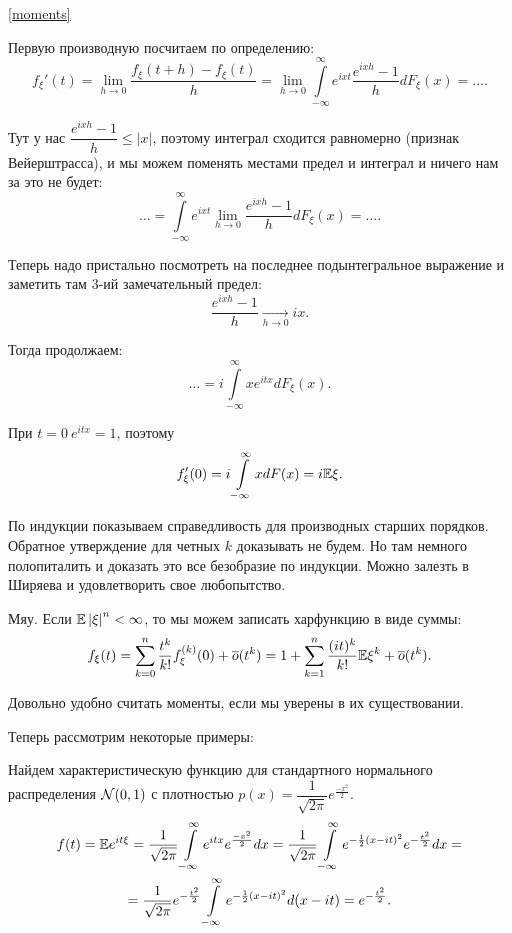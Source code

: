 \documentclass[../TV&MS.tex]{subfiles}
\begin{document}
\begin{Proof} \eqref{moments}

    Первую производную посчитаем по определению:
    \[
        f_\xi'(t) = \lim\limits_{h \rightarrow 0} \frac{f_\xi(t + h) - f_\xi(t)}{h}=
        \lim\limits_{h \rightarrow 0} \int\limits_{-\infty}^{\infty} e^{ixt} 
        \frac{e^{ixh} - 1}{h} dF_\xi(x) = \ldots. 
    \]
    
    Тут у нас $\dfrac{e^{ixh} - 1}{h} \leqslant \left| x \right|$,
    поэтому интеграл сходится равномерно (признак Вейерштрасса),
    и мы можем поменять местами предел и интеграл и ничего нам за это не будет:
    \[
        \ldots = \int\limits_{-\infty}^{\infty} e^{ixt} 
        \lim\limits_{h \rightarrow 0} \frac{e^{ixh} - 1}{h} dF_\xi(x) = \ldots.
    \] 
    
    Теперь надо пристально посмотреть на последнее подынтегральное выражение и заметить 
    там $3$-ий замечательный предел:
    \[
        \frac{e^{ixh} - 1}{h} \xrightarrow[h \rightarrow 0]{} ix.
    \] 
    
    Тогда продолжаем:
    \[
        \ldots = i \int\limits_{-\infty}^{\infty} xe^{itx}dF_\xi(x).
    \]
    
    При $t = 0 \  e^{itx} = 1$, поэтому
    \[
        f_\xi'(0) = i \int\limits_{-\infty}^{\infty} xdF(x) = i \mathbb{E} \xi.
    \]
    
    По индукции показываем справедливость для производных старших порядков.
    Обратное утверждение для четных $k$ доказывать не будем. Но там немного 
    полопиталить и доказать это все безобразие по индукции. Можно залезть в 
    Ширяева и удовлетворить свое любопытство.
\end{Proof}

\begin{Why}
    Мяу. Если $\mathbb{E} \left| \xi \right|^n < \infty$, 
    то мы можем записать харфункцию в виде суммы:
    \[
        f_\xi(t) = \sum\limits_{k=0}^{n} \frac{t^k}{k!}f_\xi^{(k)}(0) +\overline{o}(t^{k}) =
        1 + \sum\limits_{k=1}^{n} \frac{(it)^k}{k!} \mathbb{E} \xi^k + \overline{o}(t^{k}).
    \]
    
    Довольно удобно считать моменты, если мы уверены в их существовании.
\end{Why} 

	Теперь рассмотрим некоторые примеры:

\begin{Ex}
    Найдем характеристическую функцию для стандартного нормального распределения $\mathcal{N}(0, 1)$
    с плотностью $p(x) = \dfrac{1}{\sqrt{2\pi}} e^{\frac{-x^2}{2}}$.
    \begin{multline*}
        f(t) = \mathbb{E} e^{it\xi} = 
        \frac{1}{\sqrt{2\pi}}\int\limits_{-\infty}^{\infty} e^{itx} e^{\frac{-x^2}{2}} dx =
        \frac{1}{\sqrt{2\pi}} \int\limits_{-\infty}^{\infty} 
        e^{-\frac{1}{2}(x - it)^2} e^{-\frac{t^2}{2}}dx = \\
        = \frac{1}{\sqrt{2\pi}} e^{-\frac{t^2}{2}} \int\limits_{-\infty}^{\infty}  
        e^{-\frac{1}{2}(x - it)^2}d(x - it) = e^{-\frac{t^2}{2}}.
    \end{multline*}
\end{Ex}
\end{document}
